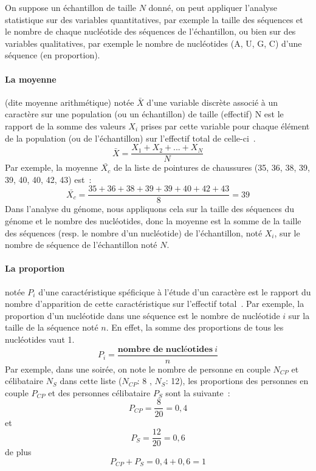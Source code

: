 \documentclass[12pt]{article}
\begin{document}
On suppose un échantillon de taille $N$ donné, on peut appliquer l'analyse statistique sur des variables quantitatives, par exemple la taille des séquences et le nombre de chaque nucléotide des séquences de l'échantillon, ou bien sur des variables qualitatives, par exemple le nombre de nucléotides (A, U, G, C) d'une séquence (en proportion).
\paragraph{La moyenne} (dite moyenne arithmétique) notée $\bar{X}$ d'une variable discrète associé à un caractère sur une population (ou un échantillon) de taille (effectif) N est le rapport de la somme des valeurs $X_i$ prises par cette variable pour chaque élément de la population (ou de l'échantillon) sur l'effectif total de celle-ci~\cite{stats}. 
    \begin{equation}
        \bar{X} = \frac{X_1 + X_2 + ... + X_N}{N}
        \label{moy}
    \end{equation}
Par exemple, la moyenne $\bar{X_c}$ de la liste de pointures de chaussures (35, 36, 38, 39, 39, 40, 40, 42, 43) est~:
    \[\bar{X_c} = \frac{35 + 36 + 38 + 39 + 39 + 40 + 42 + 43}{8} = 39\]
Dans l'analyse du génome, nous appliquons cela sur la taille des séquences du génome et le nombre des nucléotides, donc la moyenne est la somme de la taille des séquences (resp. le nombre d'un nucléotide) de l'échantillon, noté $X_i$, sur le nombre de séquence de l'échantillon noté $N$.

\paragraph{La proportion} notée $P_i$ d'une caractéristique spéficique à l'étude d'un caractère est le rapport du nombre d'apparition de cette caractéristique sur l'effectif total~\cite{stats}. Par exemple, la proportion d'un nucléotide dans une séquence est le nombre de nucléotide $i$ sur la taille de la séquence noté $n$. En effet, la somme des proportions de tous les nucléotides vaut 1.
    \begin{equation}
        P_i = \frac{\textbf{nombre~de~nucléotides}~i}{n}
        \label{prop}
    \end{equation}
Par exemple, dans une soirée, on note le nombre de personne en couple $N_{CP}$ et célibataire $N_S$ dans cette liste ($N_{CP}$: 8 , $N_S$: 12), les proportions des personnes en couple $P_{CP}$ et des personnes célibataire $P_{S}$ sont la suivante~:
    \[P_{CP} = \frac{8}{20} = 0,4\] et \[P_{S} = \frac{12}{20} = 0,6\] de plus \[P_{CP} + P_{S} = 0,4 + 0,6 = 1\]
        
\end{document}
